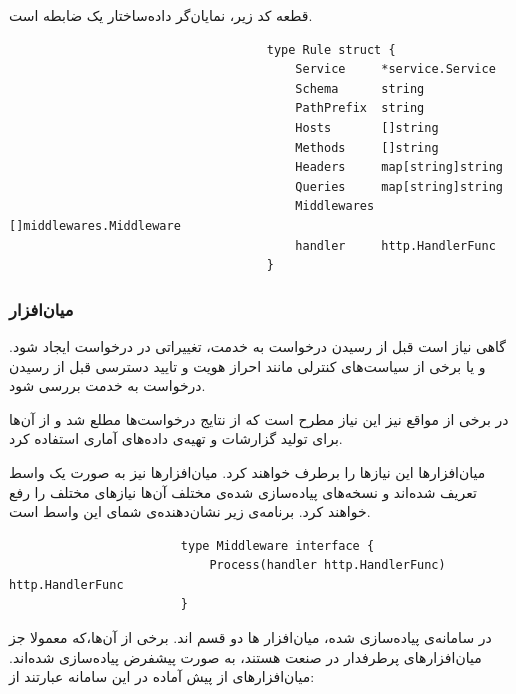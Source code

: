 قطعه کد زیر، نمایان‌گر داده‌ساختار یک ضابطه است.

\begin{latin}
    \begin{lstlisting}
                                    type Rule struct {
                                        Service     *service.Service
                                        Schema      string
                                        PathPrefix  string
                                        Hosts       []string
                                        Methods     []string
                                        Headers     map[string]string
                                        Queries     map[string]string
                                        Middlewares []middlewares.Middleware
                                        handler     http.HandlerFunc
                                    }
    \end{lstlisting}
\end{latin}

\subsubsection{میان‌افزار}\label{subsubsec:impl_middleware}
گاهی نیاز است قبل از رسیدن درخواست به خدمت، تغییراتی در درخواست ایجاد شود. و یا برخی از سیاست‌های کنترلی مانند احراز هویت و تایید دسترسی قبل از رسیدن درخواست به خدمت بررسی شود.

در برخی از مواقع نیز این نیاز مطرح است که از نتایج درخواست‌ها مطلع شد و از آن‌ها برای تولید گزارشات و تهیه‌ی داده‌های آماری استفاده کرد.

میان‌افزار‌ها این نیاز‌ها را برطرف خواهند کرد. میان‌افزار‌ها نیز به صورت یک واسط تعریف شده‌اند و نسخه‌های پیاده‌سازی شده‌ی مختلف ‌آن‌ها نیاز‌های مختلف را رفع خواهند کرد. برنامه‌ی زیر نشان‌دهنده‌ی شمای این واسط است.

\begin{latin}
    \begin{lstlisting}
                        type Middleware interface {
                            Process(handler http.HandlerFunc) http.HandlerFunc
                        }
    \end{lstlisting}
\end{latin}

در سامانه‌ی پیاده‌سازی شده، میان‌افزار ها دو قسم اند. برخی از آن‌ها،‌که معمولا جز میان‌افزار‌های پرطرفدار در صنعت هستند، به صورت پیشفرض پیاده‌سازی شده‌اند.
میان‌افزار‌های از پیش آماده در این سامانه عبارتند از:

